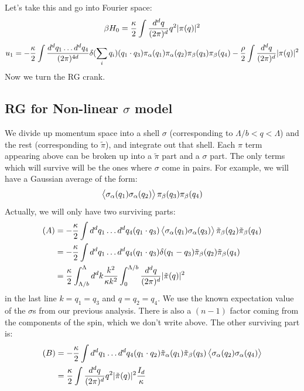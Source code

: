Let's take this and go into Fourier space:
\begin{equation}
    \beta H_0 = \frac{\kappa}{2}\int \frac{d^dq}{(2\pi)^d}q^2\lvert \pi(q) \rvert^2
\end{equation}
\begin{equation}
    u_1 = -\frac{\kappa}{2}\int \frac{d^dq_1 \ldots d^dq_4}{(2\pi)^{4d}} \delta(\sum_i q_i)(q_1 \cdot q_3)\pi_\alpha(q_1)\pi_\alpha(q_2)\pi_\beta(q_3)\pi_\beta(q_4) - \frac{\rho}{2}\int \frac{d^dq}{(2\pi)^d}\lvert \pi(q) \rvert^2
\end{equation}
Now we turn the RG crank.

\subsection{RG for Non-linear $\sigma$ model}
We divide up momentum space into a shell $\sigma$ (corresponding to $\Lambda/b < q < \Lambda$) and the rest (corresponding to $\tilde{\pi}$), and integrate out that shell. Each $\pi$ term appearing above can be broken up into a $\tilde{\pi}$ part and a $\sigma$ part. The only terms which will survive will be the ones where $\sigma$ come in pairs. For example, we will have a Gaussian average of the form:
\begin{equation}
    \left< \sigma_\alpha(q_1)\sigma_\alpha(q_2) \right>\pi_\beta(q_3)\pi_\beta(q_4)
\end{equation}
Actually, we will only have two surviving parts:
\begin{equation}
    \begin{split}
        (A) &= -\frac{\kappa}{2}\int d^dq_1 \ldots d^dq_4 (q_1 \cdot q_3)\left< \sigma_\alpha(q_1)\sigma_\alpha(q_3) \right>\tilde{\pi}_\beta(q_2)\tilde{\pi}_\beta(q_4)
        \\ &= -\frac{\kappa}{2}\int d^dq_1 \ldots d^dq_4 (q_1 \cdot q_3)\delta(q_1 - q_3)\tilde{\pi}_\beta(q_2)\tilde{\pi}_\beta(q_4)
        \\ &= \frac{\kappa}{2}\int_{\Lambda/b}^\Lambda d^dk \frac{k^2}{\kappa k^2}\int_0^{\Lambda/b}\frac{d^dq}{(2\pi)^d}\lvert \tilde{\pi}(q) \rvert^2
    \end{split}
\end{equation}
in the last line $k = q_1 = q_3$ and $q = q_2 = q_4$. We use the known expectation value of the $\sigma$s from our previous analysis. There is also a $(n - 1)$ factor coming from the components of the spin, which we don't write above. The other surviving part is:
\begin{equation}
    \begin{split}
        (B) &= -\frac{\kappa}{2}\int d^dq_1 \ldots d^dq_4(q_1 \cdot q_2)\tilde{\pi}_{\alpha}(q_1)\tilde{\pi}_\beta(q_3)\left< \sigma_\alpha(q_2)\sigma_\alpha(q_4) \right>
        \\ &= \frac{\kappa}{2}\int \frac{d^dq}{(2\pi)^d}q^2\lvert \tilde{\pi}(q) \rvert^2 \frac{I_d}{\kappa}
    \end{split}
\end{equation}
